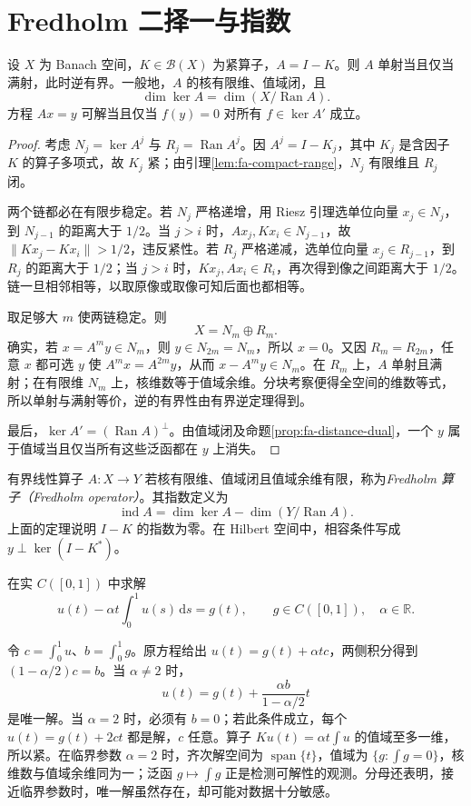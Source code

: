 \section{Fredholm 二择一与指数}
\begin{theorem}\label{thm:fa-fredholm-alternative}
设 $X$ 为 Banach 空间，$K\in\mathcal B(X)$ 为紧算子，$A=I-K$。则 $A$ 单射当且仅当满射，此时逆有界。一般地，$A$ 的核有限维、值域闭，且
\[
 \dim\ker A=\dim(X/\operatorname{Ran}A).
\]
方程 $Ax=y$ 可解当且仅当 $f(y)=0$ 对所有 $f\in\ker A'$ 成立。
\end{theorem}
\begin{proof}
考虑 $N_j=\ker A^j$ 与 $R_j=\operatorname{Ran}A^j$。因 $A^j=I-K_j$，其中 $K_j$ 是含因子 $K$ 的算子多项式，故 $K_j$ 紧；由引理\ref{lem:fa-compact-range}，$N_j$ 有限维且 $R_j$ 闭。

两个链都必在有限步稳定。若 $N_j$ 严格递增，用 Riesz 引理选单位向量 $x_j\in N_j$，到 $N_{j-1}$ 的距离大于 $1/2$。当 $j>i$ 时，$Ax_j,Kx_i\in N_{j-1}$，故 $\|Kx_j-Kx_i\|>1/2$，违反紧性。若 $R_j$ 严格递减，选单位向量 $x_j\in R_{j-1}$，到 $R_j$ 的距离大于 $1/2$；当 $j>i$ 时，$Kx_j,Ax_i\in R_i$，再次得到像之间距离大于 $1/2$。链一旦相邻相等，以取原像或取像可知后面也都相等。

取足够大 $m$ 使两链稳定。则
\[
 X=N_m\oplus R_m.
\]
确实，若 $x=A^my\in N_m$，则 $y\in N_{2m}=N_m$，所以 $x=0$。又因 $R_m=R_{2m}$，任意 $x$ 都可选 $y$ 使 $A^mx=A^{2m}y$，从而 $x-A^my\in N_m$。在 $R_m$ 上，$A$ 单射且满射；在有限维 $N_m$ 上，核维数等于值域余维。分块考察便得全空间的维数等式，所以单射与满射等价，逆的有界性由有界逆定理得到。

最后，$\ker A'=(\operatorname{Ran}A)^\perp$。由值域闭及命题\ref{prop:fa-distance-dual}，一个 $y$ 属于值域当且仅当所有这些泛函都在 $y$ 上消失。
\end{proof}
有界线性算子 $A:X\to Y$ 若核有限维、值域闭且值域余维有限，称为\emph{Fredholm 算子（Fredholm operator）}。其指数定义为
\begin{equation}
 \operatorname{ind}A=\dim\ker A-\dim(Y/\operatorname{Ran}A).
 \label{eq:fa-fredholm-index}
\end{equation}
上面的定理说明 $I-K$ 的指数为零。在 Hilbert 空间中，相容条件写成 $y\perp\ker(I-K^*)$。

\begin{example}\label{ex:fa-rank-one-fredholm}
在实 $C([0,1])$ 中求解
\[
 u(t)-\alpha t\int_0^1u(s)\,\mathrm ds=g(t),
 \qquad g\in C([0,1]),\quad\alpha\in\mathbb R.
\]
\end{example}
\begin{solve}
令 $c=\int_0^1u$、$b=\int_0^1g$。原方程给出 $u(t)=g(t)+\alpha tc$，两侧积分得到 $(1-\alpha/2)c=b$。当 $\alpha\ne2$ 时，
\[
 u(t)=g(t)+\frac{\alpha b}{1-\alpha/2}t
\]
是唯一解。当 $\alpha=2$ 时，必须有 $b=0$；若此条件成立，每个 $u(t)=g(t)+2ct$ 都是解，$c$ 任意。算子 $Ku(t)=\alpha t\int u$ 的值域至多一维，所以紧。在临界参数 $\alpha=2$ 时，齐次解空间为 $\operatorname{span}\{t\}$，值域为 $\{g:\int g=0\}$，核维数与值域余维同为一；泛函 $g\mapsto\int g$ 正是检测可解性的观测。分母还表明，接近临界参数时，唯一解虽然存在，却可能对数据十分敏感。
\end{solve}

